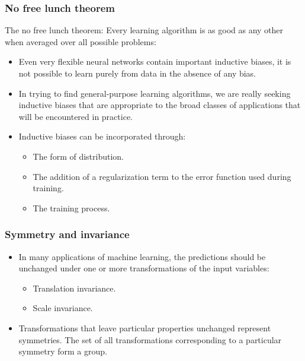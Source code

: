 \documentclass{beamer}
\begin{document}
\begin{frame}
    \frametitle{No free lunch theorem}
    The no free lunch theorem: Every learning algorithm is as good as any other when averaged over all possible problems:
    \begin{itemize}
        \item Even very flexible neural networks contain important inductive biases, it is not possible to learn purely from data in the absence of any bias.
        \item In trying to find general-purpose learning algorithms, we are really seeking inductive biases that are appropriate to the broad classes of applications that will be encountered in practice.
        \item Inductive biases can be incorporated through:
        \begin{itemize}
            \item The form of distribution.
            \item The addition of a regularization term to the error function used during training.
            \item The training process.
        \end{itemize}
    \end{itemize}
\end{frame}

\begin{frame}
    \frametitle{Symmetry and invariance}
    \begin{itemize}
        \item In many applications of machine learning, the predictions should be unchanged under one or more transformations of the input variables:
        \begin{itemize}
            \item Translation invariance.
            \item Scale invariance.
        \end{itemize}
        \item Transformations that leave particular properties unchanged represent symmetries. The set of all transformations corresponding to a particular symmetry form a group.
    \end{itemize}
\end{frame}
\end{document}
